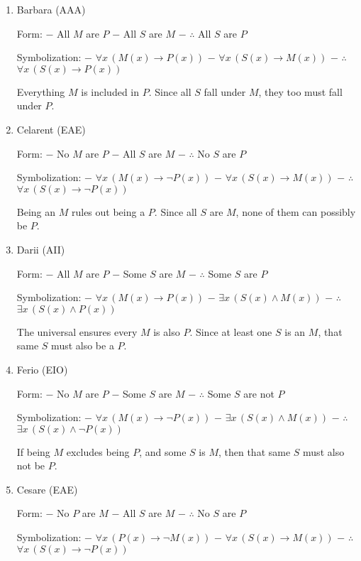 \begin{enumerate}
\def\labelenumi{\arabic{enumi}.}
\item
  Barbara (AAA)

  Form: − All \(M\) are \(P\) − All \(S\) are \(M\) − \(\therefore\) All
  \(S\) are \(P\)

  Symbolization: − \(\forall x \, (M(x) \rightarrow P(x))\) −
  \(\forall x \, (S(x) \rightarrow M(x))\) − \(\therefore\)
  \(\forall x \, (S(x) \rightarrow P(x))\)

  Everything \(M\) is included in \(P\). Since all \(S\) fall under
  \(M\), they too must fall under \(P\).
\item
  Celarent (EAE)

  Form: − No \(M\) are \(P\) − All \(S\) are \(M\) − \(\therefore\) No
  \(S\) are \(P\)

  Symbolization: − \(\forall x \, (M(x) \rightarrow \lnot P(x))\) −
  \(\forall x \, (S(x) \rightarrow M(x))\) − \(\therefore\)
  \(\forall x \, (S(x) \rightarrow \lnot P(x))\)

  Being an \(M\) rules out being a \(P\). Since all \(S\) are \(M\),
  none of them can possibly be \(P\).
\item
  Darii (AII)

  Form: − All \(M\) are \(P\) − Some \(S\) are \(M\) − \(\therefore\)
  Some \(S\) are \(P\)

  Symbolization: − \(\forall x \, (M(x) \rightarrow P(x))\) −
  \(\exists x \, (S(x) \land M(x))\) − \(\therefore\)
  \(\exists x \, (S(x) \land P(x))\)

  The universal ensures every \(M\) is also \(P\). Since at least one
  \(S\) is an \(M\), that same \(S\) must also be a \(P\).
\item
  Ferio (EIO)

  Form: − No \(M\) are \(P\) − Some \(S\) are \(M\) − \(\therefore\)
  Some \(S\) are not \(P\)

  Symbolization: − \(\forall x \, (M(x) \rightarrow \lnot P(x))\) −
  \(\exists x \, (S(x) \land M(x))\) − \(\therefore\)
  \(\exists x \, (S(x) \land \lnot P(x))\)

  If being \(M\) excludes being \(P\), and some \(S\) is \(M\), then
  that same \(S\) must also not be \(P\).
\item
  Cesare (EAE)

  Form: − No \(P\) are \(M\) − All \(S\) are \(M\) − \(\therefore\) No
  \(S\) are \(P\)

  Symbolization: − \(\forall x \, (P(x) \rightarrow \lnot M(x))\) −
  \(\forall x \, (S(x) \rightarrow M(x))\) − \(\therefore\)
  \(\forall x \, (S(x) \rightarrow \lnot P(x))\)


\end{enumerate}
